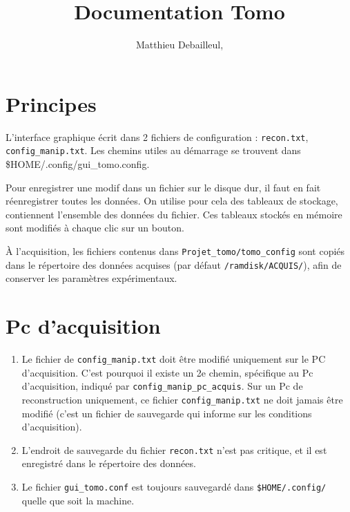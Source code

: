 \documentclass[	french,DIV=calc,%
							paper=a4,%
							fontsize=11pt,%
							twocolumn]{scrartcl}	 					%
\title{Documentation Tomo}					%
\author{Matthieu Debailleul, }											%
\date{}																				%
\newcommand{\code}[1]{\texttt{#1}}
\newcommand{\initial}[1]{%
     \lettrine[lines=3,lhang=0.3,nindent=0em]{
     				\color{DarkGoldenrod}
     				{\textsf{#1}}}{}}
\begin{document}
\maketitle
\thispagestyle{fancy} 			%


\section{Principes}

L'interface graphique écrit dans 2 fichiers de configuration : \code{recon.txt}, \code{config\_manip.txt}. Les chemins utiles au démarrage se trouvent dans \$HOME/.config/gui\_tomo.config.


Pour enregistrer une modif dans un fichier sur le disque dur, il faut en fait réenregistrer toutes les données.
On utilise pour cela des tableaux de stockage, contiennent l'ensemble des données du fichier.
Ces tableaux stockés en mémoire sont modifiés à chaque clic sur un bouton.

À l'acquisition, les fichiers contenus dans \code{Projet\_tomo/tomo\_config} sont copiés dans le répertoire des données acquises (par défaut \code{/ramdisk/ACQUIS/}), afin de conserver les paramètres expérimentaux. 

\section{Pc d'acquisition}
\begin{enumerate}
 \item Le fichier de \code{config\_manip.txt} doit être modifié uniquement sur le PC d'acquisition. C'est pourquoi il existe un 2e chemin, spécifique au Pc d'acquisition, indiqué par \code{config\_manip\_pc\_acquis}. 
Sur un Pc de reconstruction uniquement, ce fichier \code{config\_manip.txt} ne doit jamais être modifié (c'est un fichier de sauvegarde qui informe sur les conditions d'acquisition).

\item L'endroit de sauvegarde du fichier  \code{recon.txt} n'est pas critique, et il est enregistré dans le répertoire des données. 
\item 
Le fichier \code{gui\_tomo.conf} est toujours sauvegardé dans \code{\$HOME/.config/} quelle que soit la machine. 
\end{enumerate}
\end{document}
